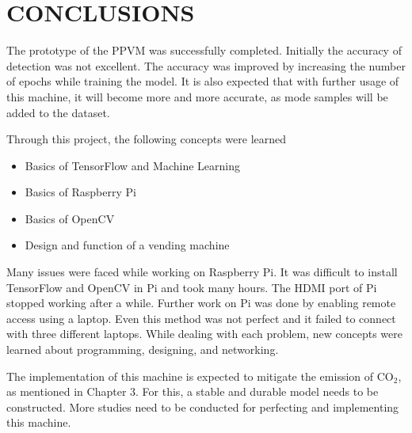 \chapter{CONCLUSIONS}\label{conc}
\thispagestyle{empty}

The prototype of the PPVM was successfully completed. Initially the accuracy of detection was not excellent. The accuracy was improved by increasing the number of epochs while training the model. It is also expected that with further usage of this machine, it will become more and more accurate, as mode samples will be added to the dataset.

Through this project, the following concepts were learned
\begin{itemize}
	\item Basics of TensorFlow and Machine Learning
	\item Basics of Raspberry Pi
	\item Basics of OpenCV
	\item Design and function of a vending machine
\end{itemize}

Many issues were faced while working on Raspberry Pi. It was difficult to install TensorFlow and OpenCV in Pi and took many hours. The HDMI port of Pi stopped working after a while. Further work on Pi was done by enabling remote access using
a laptop. Even this method was not perfect and it failed to connect with three different laptops. While dealing with each problem, new concepts were learned about programming, designing, and networking. 

The implementation of this machine is expected to mitigate the emission of CO$_2$, as mentioned in Chapter 3. For this, a stable and durable model needs to be constructed. More studies need to be conducted for perfecting and implementing this machine.